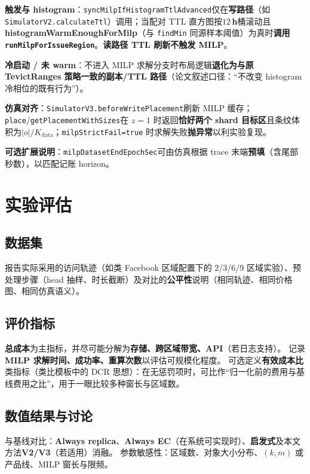 \documentclass[conference]{IEEEtran}
\begin{document}
\textbf{触发与 histogram}：\texttt{syncMilpIfHistogramTtlAdvanced}仅在\textbf{写路径}（如 \texttt{SimulatorV2.calculateTtl}）调用；当配对 TTL 直方图按\textbf{$12$\,h}桶滚动且\textbf{histogramWarmEnoughForMilp}（与 \texttt{findMin} 同源样本阈值）为真时\textbf{调用 \texttt{runMilpForIssueRegion}}。\textbf{读路径 TTL 刷新不触发 MILP}。

\textbf{冷启动 / 未 warm}：不进入 MILP 求解分支时布局逻辑\textbf{退化为与原 TevictRanges 策略一致的副本/TTL 路径}（论文叙述口径：``不改变 histogram 冷相位的既有行为''）。

\textbf{仿真对齐}：\texttt{SimulatorV3.beforeWritePlacement}刷新 MILP 缓存；\texttt{place}/\texttt{getPlacementWithSizes}在 $z{=}1$ 时返回\textbf{恰好两个 shard 目标区}且条纹体积为\textbf{$|o|/K_{\mathrm{data}}$}；\texttt{milpStrictFail=true} 时求解失败\textbf{抛异常}以利实验复现。

\textbf{可选扩展说明}：\texttt{milpDatasetEndEpochSec}可由仿真根据 trace 末端\textbf{预填}（含尾部秒数），以匹配记账 horizon。

\section{实验评估}
\label{sec:eval}

\subsection{数据集}
报告实际采用的访问轨迹（如类 Facebook 区域配置下的 2/3/6/9 区域实验）、预处理步骤（head 抽样、时长截断）及对比的\textbf{公平性}说明（相同轨迹、相同价格图、相同仿真语义）。

\subsection{评价指标}
\textbf{总成本}为主指标，并尽可能分解为\textbf{存储、跨区域带宽、API}（若日志支持）。
记录\textbf{MILP 求解时间、成功率、重算次数}以评估可规模化程度。
可选定义\textbf{有效成本比}类指标（类比模板中的 DCR 思想）：在无惩罚项时，可比作``归一化前的费用与基线费用之比''，用于一眼比较多种窗长与区域数。

\subsection{数值结果与讨论}
与基线对比：\textbf{Always replica}、\textbf{Always EC}（在系统可实现时）、\textbf{启发式}及本文方法\textbf{V2/V3}（若适用）消融。
参数敏感性：区域数、对象大小分布、$(k,m)$ 或产品线、MILP 窗长与限频。
\end{document}
